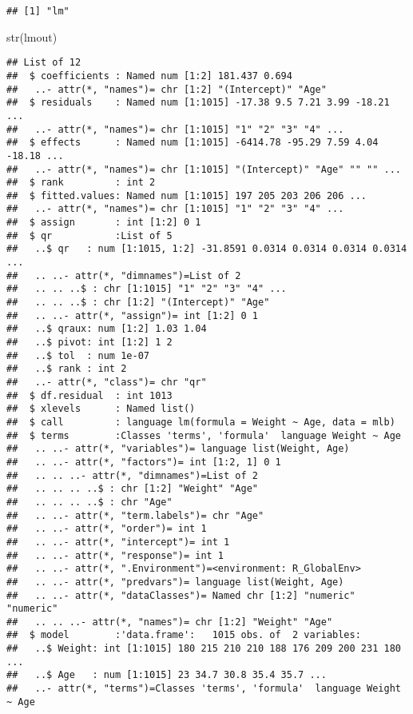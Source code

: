 \documentclass[
]{article}
\newenvironment{Shaded}{\begin{snugshade}}{\end{snugshade}}
\newcommand{\FunctionTok}[1]{\textcolor[rgb]{0.00,0.00,0.00}{#1}}
\newcommand{\NormalTok}[1]{#1}
\begin{document}
\begin{verbatim}
## [1] "lm"
\end{verbatim}

\begin{Shaded}
\begin{Highlighting}[]
\FunctionTok{str}\NormalTok{(lmout)}
\end{Highlighting}
\end{Shaded}

\begin{verbatim}
## List of 12
##  $ coefficients : Named num [1:2] 181.437 0.694
##   ..- attr(*, "names")= chr [1:2] "(Intercept)" "Age"
##  $ residuals    : Named num [1:1015] -17.38 9.5 7.21 3.99 -18.21 ...
##   ..- attr(*, "names")= chr [1:1015] "1" "2" "3" "4" ...
##  $ effects      : Named num [1:1015] -6414.78 -95.29 7.59 4.04 -18.18 ...
##   ..- attr(*, "names")= chr [1:1015] "(Intercept)" "Age" "" "" ...
##  $ rank         : int 2
##  $ fitted.values: Named num [1:1015] 197 205 203 206 206 ...
##   ..- attr(*, "names")= chr [1:1015] "1" "2" "3" "4" ...
##  $ assign       : int [1:2] 0 1
##  $ qr           :List of 5
##   ..$ qr   : num [1:1015, 1:2] -31.8591 0.0314 0.0314 0.0314 0.0314 ...
##   .. ..- attr(*, "dimnames")=List of 2
##   .. .. ..$ : chr [1:1015] "1" "2" "3" "4" ...
##   .. .. ..$ : chr [1:2] "(Intercept)" "Age"
##   .. ..- attr(*, "assign")= int [1:2] 0 1
##   ..$ qraux: num [1:2] 1.03 1.04
##   ..$ pivot: int [1:2] 1 2
##   ..$ tol  : num 1e-07
##   ..$ rank : int 2
##   ..- attr(*, "class")= chr "qr"
##  $ df.residual  : int 1013
##  $ xlevels      : Named list()
##  $ call         : language lm(formula = Weight ~ Age, data = mlb)
##  $ terms        :Classes 'terms', 'formula'  language Weight ~ Age
##   .. ..- attr(*, "variables")= language list(Weight, Age)
##   .. ..- attr(*, "factors")= int [1:2, 1] 0 1
##   .. .. ..- attr(*, "dimnames")=List of 2
##   .. .. .. ..$ : chr [1:2] "Weight" "Age"
##   .. .. .. ..$ : chr "Age"
##   .. ..- attr(*, "term.labels")= chr "Age"
##   .. ..- attr(*, "order")= int 1
##   .. ..- attr(*, "intercept")= int 1
##   .. ..- attr(*, "response")= int 1
##   .. ..- attr(*, ".Environment")=<environment: R_GlobalEnv> 
##   .. ..- attr(*, "predvars")= language list(Weight, Age)
##   .. ..- attr(*, "dataClasses")= Named chr [1:2] "numeric" "numeric"
##   .. .. ..- attr(*, "names")= chr [1:2] "Weight" "Age"
##  $ model        :'data.frame':   1015 obs. of  2 variables:
##   ..$ Weight: int [1:1015] 180 215 210 210 188 176 209 200 231 180 ...
##   ..$ Age   : num [1:1015] 23 34.7 30.8 35.4 35.7 ...
##   ..- attr(*, "terms")=Classes 'terms', 'formula'  language Weight ~ Age

\end{verbatim}
\end{document}
